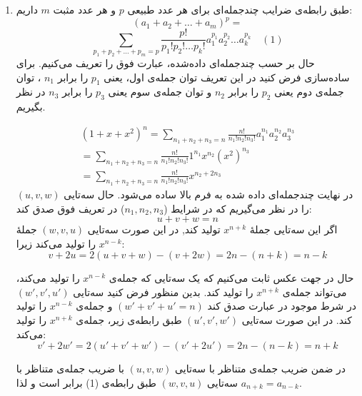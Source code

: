 	\begin{enumerate}
		\item 
        \p
        طبق رابطه‌ی ضرایب چندجمله‌ای برای هر عدد
         طبیعی 
         $p$
         و هر عدد مثبت 
         $m$ 
          داریم:
        $$(a_1+a_2+\ldots+a_m)^p = $$
        $$\sum_{p_1+p_2+\ldots+p_m=p} \frac{p!}{p_1!p_2!\ldots p_k!} a_1^{p_1}a_2^{p_2}\ldots a_k^{p_k} \quad (1)$$
        حال بر حسب چندجمله‌ای داده‌شده، عبارت فوق را تعریف می‌کنیم. برای ساده‌سازی فرض کنید در این تعریف توان جمله‌ی اول، یعنی
        $p_1$
        را برابر $n_1$ ،
        توان جمله‌ی دوم یعنی 
        $p_2$
        را برابر 
        $n_2$
        و توان جمله‌ی سوم یعنی
        $p_3$
        را برابر $n_3$ در نظر بگیریم.
        
        \begin{align*}
		(1+x+x^2)^n = \sum_{n_1+n_2+n_3=n} \frac{n!}{n_1!n_2!n_3!} a_1^{n_1} a_2^{n_2} a_3^{n_3}\\
		= \sum_{n_1+n_2+n_3=n} \frac{n!}{n_1!n_2!n_3!} 1^{n_1} x^{n_2} (x^2)^{n_3}\\
		= \sum_{n_1+n_2+n_3=n} \frac{n!}{n_1!n_2!n_3!} x^{n_2 + 2n_3}
        \end{align*}
		در نهایت چندجمله‌ای داده شده به فرم بالا ساده می‌شود.
		حال سه‌تایی
         $(u , v , w)$
         را در نظر می‌گیریم که در شرایط 
         ($n_1 , n_2 , n_3$)
       در تعریف فوق صدق کند:
       $$u + v + w = n$$
        اگر این سه‌تایی  جملهٔ $x^{n + k}$ تولید کند, در این صورت سه‌تایی $(w , v , u)$ جملهٔ $x^{n - k}$ را تولید می‌کند زیرا:
        $$v + 2u = 2(u + v + w) - (v + 2w) = 2n - (n + k) = n -k$$
        
        \p
        حال در جهت عکس ثابت می‌کنیم که یک سه‌تایی که جمله‌ی
        $x^{n-k}$
        را تولید می‌کند، می‌تواند جمله‌ی
        $x^{n+k}$
        را تولید کند. بدین منظور فرض کنید سه‌تایی
        $(w', v', u')$
        در شرط موجود در عبارت صدق کند
        $(w' + v' + u'=n)$
        و جمله‌ی
        $x^{n-k}$
        را تولید کند.
        در این صورت سه‌تایی
        $(u',v',w')$
        طبق رابطه‌ی زیر، جمله‌ی 
        $x^{n+k}$
        را تولید می‌کند:
    	$$v' + 2w' = 2(u' + v' + w') - (v' + 2u') = 2n - (n - k) = n +k$$
	
        \p
    	در ضمن ضریب جمله‌ی متناظر با سه‌تایی 
        $(u , v , w)$ 
        با ضریب جمله‌ی متناظر با سه‌تایی 
        $(w , v , u)$
         طبق رابطه‌ی (1) برابر است و لذا 
         $a_{n + k} = a_{n - k}$.
	

\end{enumerate}
